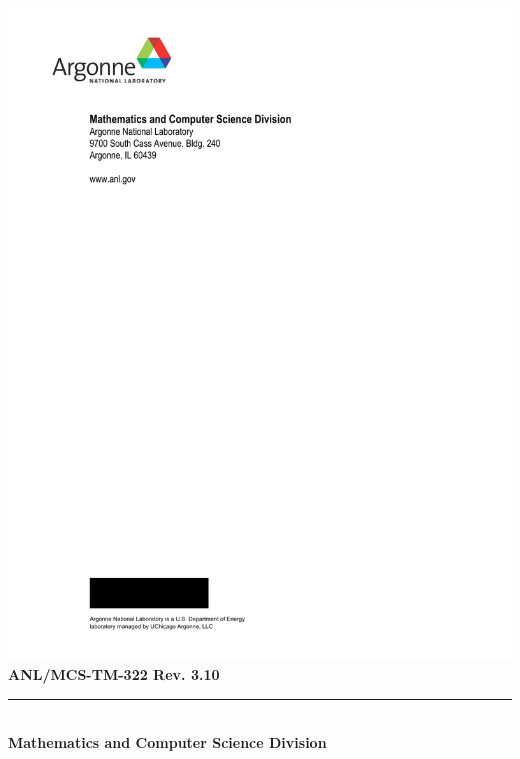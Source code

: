
\pagestyle{empty}
\hspace{-.65in}\includegraphics{ArgonneLogo}
\hfill  {\large {\bf ANL/MCS-TM-322 Rev. 3.10}}

\vspace*{2in}
\vspace*{8pt}
\hrule
\vspace*{8pt}

\vspace*{1in}
\noindent \\
{\Large {\bf Mathematics and Computer Science Division}}

\vspace*{10pt}


\vspace*{20pt}


